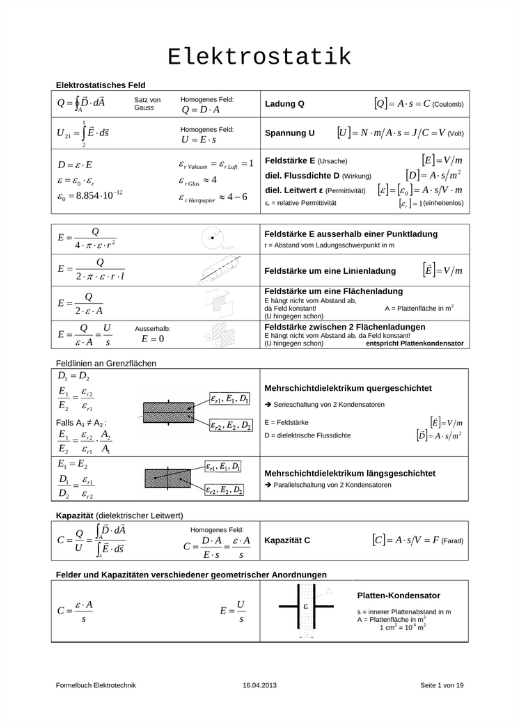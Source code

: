 \newpage
\includegraphics[page=2,scale=0.57,trim=20mm 20mm 20mm 20mm]{../ext/ET-Formelsammlung}
\newpage
